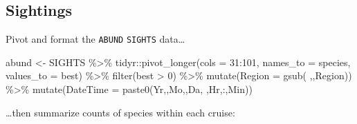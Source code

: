 \documentclass[
]{book}
\newenvironment{Shaded}{\begin{snugshade}}{\end{snugshade}}
\newcommand{\AttributeTok}[1]{\textcolor[rgb]{0.77,0.63,0.00}{#1}}
\newcommand{\DecValTok}[1]{\textcolor[rgb]{0.00,0.00,0.81}{#1}}
\newcommand{\FunctionTok}[1]{\textcolor[rgb]{0.00,0.00,0.00}{#1}}
\newcommand{\NormalTok}[1]{#1}
\newcommand{\OtherTok}[1]{\textcolor[rgb]{0.56,0.35,0.01}{#1}}
\newcommand{\SpecialCharTok}[1]{\textcolor[rgb]{0.00,0.00,0.00}{#1}}
\newcommand{\StringTok}[1]{\textcolor[rgb]{0.31,0.60,0.02}{#1}}
\begin{document}
\hypertarget{sightings}{%
\subsection*{Sightings}\label{sightings}}

Pivot and format the \texttt{ABUND} \texttt{SIGHTS} data\ldots{}

\begin{Shaded}
\begin{Highlighting}[]
\NormalTok{abund }\OtherTok{\textless{}{-}}
\NormalTok{  SIGHTS }\SpecialCharTok{\%\textgreater{}\%}
\NormalTok{  tidyr}\SpecialCharTok{::}\FunctionTok{pivot\_longer}\NormalTok{(}\AttributeTok{cols =} \DecValTok{31}\SpecialCharTok{:}\DecValTok{101}\NormalTok{,}
                      \AttributeTok{names\_to =} \StringTok{\textquotesingle{}species\textquotesingle{}}\NormalTok{,}
                      \AttributeTok{values\_to =} \StringTok{\textquotesingle{}best\textquotesingle{}}\NormalTok{) }\SpecialCharTok{\%\textgreater{}\%}
  \FunctionTok{filter}\NormalTok{(best }\SpecialCharTok{\textgreater{}} \DecValTok{0}\NormalTok{) }\SpecialCharTok{\%\textgreater{}\%}
  \FunctionTok{mutate}\NormalTok{(}\AttributeTok{Region =} \FunctionTok{gsub}\NormalTok{(}\StringTok{\textquotesingle{} \textquotesingle{}}\NormalTok{,}\StringTok{\textquotesingle{}\textquotesingle{}}\NormalTok{,Region)) }\SpecialCharTok{\%\textgreater{}\%}
  \FunctionTok{mutate}\NormalTok{(}\AttributeTok{DateTime =} \FunctionTok{paste0}\NormalTok{(Yr,}\StringTok{\textquotesingle{}{-}\textquotesingle{}}\NormalTok{,Mo,}\StringTok{\textquotesingle{}{-}\textquotesingle{}}\NormalTok{,Da,}\StringTok{\textquotesingle{} \textquotesingle{}}\NormalTok{,Hr,}\StringTok{\textquotesingle{}:\textquotesingle{}}\NormalTok{,Min))}
\end{Highlighting}
\end{Shaded}

\ldots then summarize counts of species within each cruise:
\end{document}
